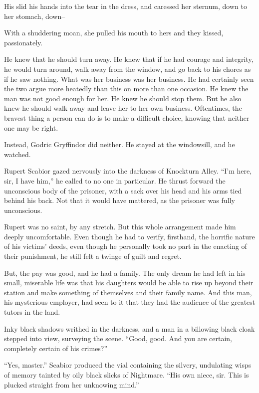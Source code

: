 His slid his hands into the tear in the dress, and caressed her sternum, down to her stomach, down–

With a shuddering moan, she pulled his mouth to hers and they kissed, passionately.
\simpleline

He knew that he should turn away. He knew that if he had courage and integrity, he would turn around, walk away from the window, and go back to his chores as if he saw nothing. What was her business was her business. He had certainly seen the two argue more heatedly than this on more than one occasion. He knew the man was not good enough for her. He knew he should stop them. But he also knew he should walk away and leave her to her own business. Oftentimes, the bravest thing a person can do is to make a difficult choice, knowing that neither one may be right.

Instead, Godric Gryffindor did neither. He stayed at the windowsill, and he watched.
\simpleline


Rupert Scabior gazed nervously into the darkness of Knockturn Alley. “I’m here, sir, I have him,” he called to no one in particular. He thrust forward the unconscious body of the prisoner, with a sack over his head and his arms tied behind his back. Not that it would have mattered, as the prisoner was fully unconscious.

Rupert was no saint, by any stretch. But this whole arrangement made him deeply uncomfortable. Even though he had to verify, firsthand, the horrific nature of his victims’ deeds, even though he personally took no part in the enacting of their punishment, he still felt a twinge of guilt and regret.

But, the pay was good, and he had a family. The only dream he had left in his small, miserable life was that his daughters would be able to rise up beyond their station and make something of themselves and their family name. And this man, his mysterious employer, had seen to it that they had the audience of the greatest tutors in the land.

Inky black shadows writhed in the darkness, and a man in a billowing black cloak stepped into view, surveying the scene. “Good, good. And you are certain, completely certain of his crimes?”

“Yes, master.” Scabior produced the vial containing the silvery, undulating wisps of memory tainted by oily black slicks of Nightmare. “His own niece, sir. This is plucked straight from her unknowing mind.”

